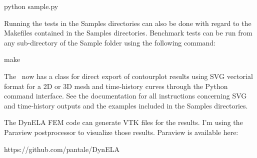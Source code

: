 \begin{BashListing}[numbers=none]
python sample.py
\end{BashListing}

Running the tests in the Samples directories can also be done with regard to the Makefiles contained in the Samples directories. Benchmark tests can be run from any sub-directory of the Sample folder using the following command:

\begin{BashListing}[numbers=none]
make
\end{BashListing}

The \DynELA~now has a class for direct export of contourplot results using SVG vectorial format for a 2D or 3D mesh and time-history curves through the Python command interface. See the documentation for all instructions concerning SVG and time-history outputs and the examples included in the Samples directories.

The DynELA FEM code can generate VTK files for the results. I'm using the Paraview postprocessor to visualize those results. Paraview is available here:

\hspace*{1cm}\textsf{\hspace*{1cm}\textsf{https://github.com/pantale/DynELA}}
